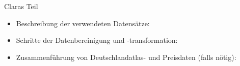 Claras Teil
\begin{itemize}
    \item Beschreibung der verwendeten Datensätze:
    \item Schritte der Datenbereinigung und -transformation:
    \item Zusammenführung von Deutschlandatlas- und Preisdaten (falls nötig):
\end{itemize}